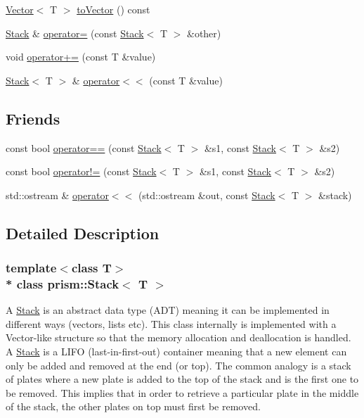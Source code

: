 \begin{DoxyCompactItemize}
\item 
\hyperlink{classprism_1_1_vector}{Vector}$<$ T $>$ \hyperlink{classprism_1_1_stack_ac373a993c993bbf07a485a2838c9cae9}{to\+Vector} () const 
\item 
\hyperlink{classprism_1_1_stack}{Stack} \& \hyperlink{classprism_1_1_stack_ae1ff12e8acc61bc0cd9434e03c36c171}{operator=} (const \hyperlink{classprism_1_1_stack}{Stack}$<$ T $>$ \&other)
\item 
void \hyperlink{classprism_1_1_stack_a6a8ec445b5503fdc5e3358dd1b100a9c}{operator+=} (const T \&value)
\item 
\hyperlink{classprism_1_1_stack}{Stack}$<$ T $>$ \& \hyperlink{classprism_1_1_stack_a6b19a970604a4edc6cccbb61f226e9e9}{operator$<$$<$} (const T \&value)
\end{DoxyCompactItemize}
\subsection*{Friends}
\begin{DoxyCompactItemize}
\item 
const bool \hyperlink{classprism_1_1_stack_aeb1f035d92d81418856c1f1c1bec54b3}{operator==} (const \hyperlink{classprism_1_1_stack}{Stack}$<$ T $>$ \&s1, const \hyperlink{classprism_1_1_stack}{Stack}$<$ T $>$ \&s2)
\item 
const bool \hyperlink{classprism_1_1_stack_aa79914f1e49ebf8bd569580a2113326d}{operator!=} (const \hyperlink{classprism_1_1_stack}{Stack}$<$ T $>$ \&s1, const \hyperlink{classprism_1_1_stack}{Stack}$<$ T $>$ \&s2)
\item 
std\+::ostream \& \hyperlink{classprism_1_1_stack_a7e1f9c28a318f010223ea59ac3d3733a}{operator$<$$<$} (std\+::ostream \&out, const \hyperlink{classprism_1_1_stack}{Stack}$<$ T $>$ \&stack)
\end{DoxyCompactItemize}


\subsection{Detailed Description}
\subsubsection*{template$<$class T$>$\\*
class prism\+::\+Stack$<$ T $>$}

A \hyperlink{classprism_1_1_stack}{Stack} is an abstract data type (A\+DT) meaning it can be implemented in different ways (vectors, lists etc). This class internally is implemented with a Vector-\/like structure so that the memory allocation and deallocation is handled.~\newline
A \hyperlink{classprism_1_1_stack}{Stack} is a L\+I\+FO (last-\/in-\/first-\/out) container meaning that a new element can only be added and removed at the end (or top). The common analogy is a stack of plates where a new plate is added to the top of the stack and is the first one to be removed. This implies that in order to retrieve a particular plate in the middle of the stack, the other plates on top must first be removed. 

